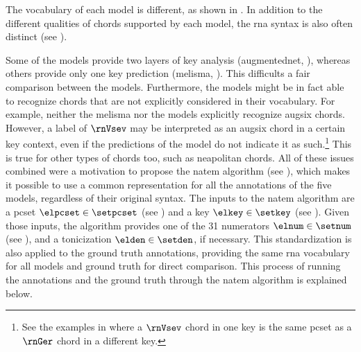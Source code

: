 
The vocabulary of each model is different, as shown in
. In addition to the different
qualities of chords supported by each model, the \gls{rna}
syntax is also often distinct (see
). 


Some of the models provide two layers of key analysis
(\gls{augmentednet}, \cite{micchi2021deep, chen2021attend}),
whereas others provide only one key prediction
(\gls{melisma}, \cite{mcleod2021modular}). This difficults a
fair comparison between the models. Furthermore, the models
might be in fact able to recognize chords that are not
explicitly considered in their vocabulary. For example,
neither the \gls{melisma} nor the
\textcite{mcleod2021modular} models explicitly recognize
\gls{augsix} chords. However, a label of $\rnVsev$ may be
interpreted as an \gls{augsix} chord in a certain key
context, even if the predictions of the model do not
indicate it as such.\footnote{See the examples in
 where a
$\rnVsev$ chord in one key is the same \gls{pcset} as a
$\rnGer$ chord in a different key.} This is true for other
types of chords too, such as \gls{neapolitan} chords. All of
these issues combined were a motivation to propose the
\gls{natem} algorithm (see
), which
makes it possible to use a common representation for all the
annotations of the five models, regardless of their original
syntax. The inputs to the \gls{natem} algorithm are a
\gls{pcset} $\elpcset \in \setpcset$ (see
) and a key $\elkey
\in \setkey$ (see ).
Given those inputs, the algorithm provides one of the 31
numerators $\elnum \in \setnum$ (see
), and a
tonicization $\elden \in \setden$, if necessary. This
standardization is also applied to the ground truth
annotations, providing the same \gls{rna} vocabulary for all
models and ground truth for direct comparison. This process
of running the annotations and the ground truth through the
\gls{natem} algorithm is explained below.

